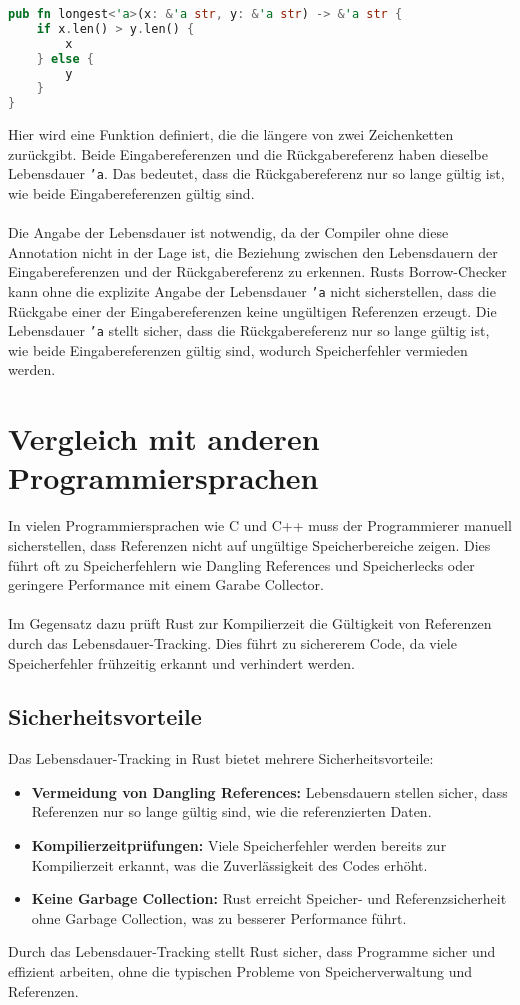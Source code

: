 \begin{lstlisting}[language=Rust, caption={Längere von zwei Zeichenketten ermitteln}]
pub fn longest<'a>(x: &'a str, y: &'a str) -> &'a str {
    if x.len() > y.len() {
        x
    } else {
        y
    }
}
\end{lstlisting}
\noindent
Hier wird eine Funktion definiert, die die längere von zwei Zeichenketten zurückgibt. 
Beide Eingabereferenzen und die Rückgabereferenz haben dieselbe Lebensdauer \texttt{'a}. 
Das bedeutet, dass die Rückgabereferenz nur so lange gültig ist, wie beide Eingabereferenzen gültig sind.\\
\\
Die Angabe der Lebensdauer ist notwendig, da der Compiler ohne diese Annotation nicht in der Lage ist, die Beziehung zwischen den Lebensdauern der Eingabereferenzen und der Rückgabereferenz zu erkennen. 
Rusts Borrow-Checker kann ohne die explizite Angabe der Lebensdauer \texttt{'a} nicht sicherstellen, dass die Rückgabe einer der Eingabereferenzen keine ungültigen Referenzen erzeugt. 
Die Lebensdauer \texttt{'a} stellt sicher, dass die Rückgabereferenz nur so lange gültig ist, wie beide Eingabereferenzen gültig sind, wodurch Speicherfehler vermieden werden.

\section{Vergleich mit anderen Programmiersprachen}
In vielen Programmiersprachen wie C und C++ muss der Programmierer manuell sicherstellen, dass Referenzen nicht auf ungültige Speicherbereiche zeigen. 
Dies führt oft zu Speicherfehlern wie Dangling References und Speicherlecks oder geringere Performance mit einem Garabe Collector.\\
\\
Im Gegensatz dazu prüft Rust zur Kompilierzeit die Gültigkeit von Referenzen durch das Lebensdauer-Tracking. 
Dies führt zu sichererem Code, da viele Speicherfehler frühzeitig erkannt und verhindert werden.

\subsection{Sicherheitsvorteile}
Das Lebensdauer-Tracking in Rust bietet mehrere Sicherheitsvorteile:

\begin{itemize}
    \item \textbf{Vermeidung von Dangling References:} Lebensdauern stellen sicher, dass Referenzen nur so lange gültig sind, wie die referenzierten Daten.
    \item \textbf{Kompilierzeitprüfungen:} Viele Speicherfehler werden bereits zur Kompilierzeit erkannt, was die Zuverlässigkeit des Codes erhöht.
    \item \textbf{Keine Garbage Collection:} Rust erreicht Speicher- und Referenzsicherheit ohne Garbage Collection, was zu besserer Performance führt.
\end{itemize}
\noindent
Durch das Lebensdauer-Tracking stellt Rust sicher, dass Programme sicher und effizient arbeiten, ohne die typischen Probleme von Speicherverwaltung und Referenzen.

